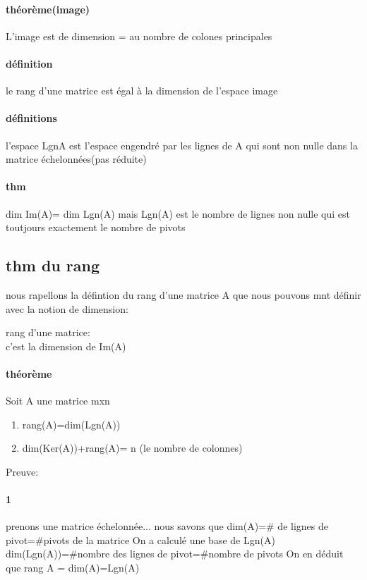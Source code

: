 \documentclass[a4paper,10pt]{article}
\begin{document}
\paragraph{théorème(image)}
L'image est de dimension = au nombre de colones principales
\paragraph{définition}
le rang d'une matrice est égal à la dimension de l'espace image
\newline
\paragraph{définitions}
l'espace LgnA est l'espace engendré par les lignes de A qui sont non nulle dans la matrice échelonnées(pas réduite)
\paragraph{thm}
dim Im(A)= dim Lgn(A)
\newline
mais Lgn(A) est le nombre de lignes non nulle qui est toutjours exactement le nombre de pivots
\subsection{thm du rang}
nous rapellons la défintion du rang d'une matrice A que nous pouvons mnt définir avec la notion de dimension:
\begin{description}
 \item rang d'une matrice: \\{c'est la dimension de Im(A)}
\end{description}
\paragraph{théorème}
Soit A une matrice mxn
\begin{enumerate}
 \item rang(A)=dim(Lgn(A))
 \item dim(Ker(A))+rang(A)= n (le nombre de colonnes)
\end{enumerate}
Preuve:
\paragraph{1}
prenons une matrice échelonnée...
\newline
nous savons que dim(A)=\# de lignes de pivot=\#pivots de la matrice
\newline
On a calculé une base de Lgn(A) dim(Lgn(A))=\#nombre des lignes de pivot=\#nombre de pivots
\newline
On en déduit que rang A = dim(A)=Lgn(A)
\end{document}
